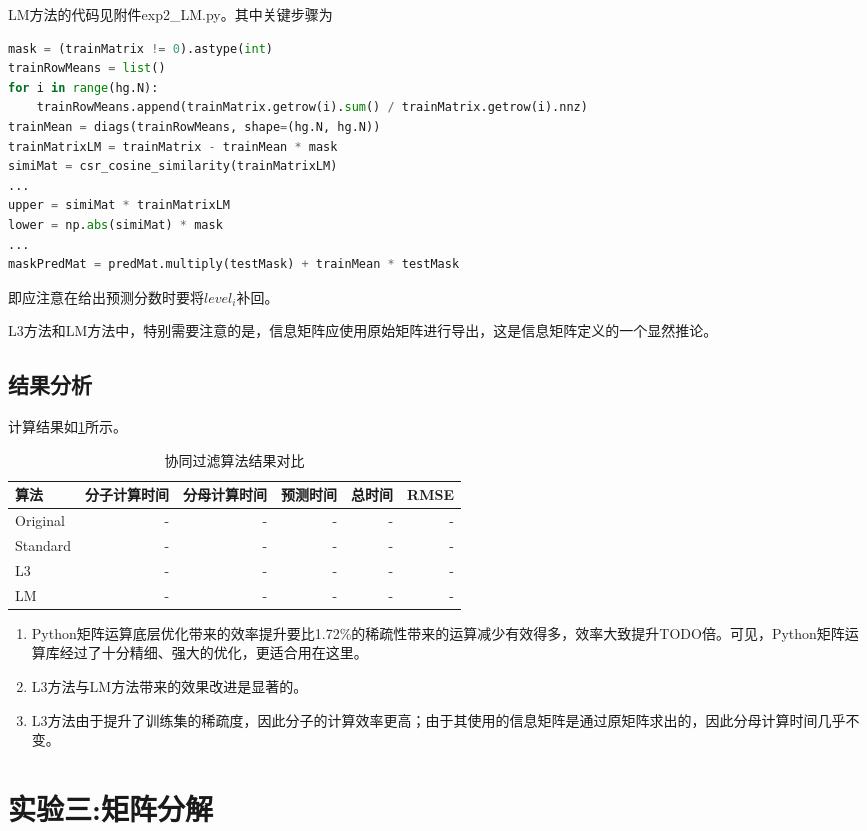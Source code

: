 \documentclass[a4paper,12pt]{article}
\begin{document}
    LM方法的代码见附件exp2\_LM.py。其中关键步骤为
    \begin{lstlisting}[language=python]
mask = (trainMatrix != 0).astype(int)
trainRowMeans = list()
for i in range(hg.N):
    trainRowMeans.append(trainMatrix.getrow(i).sum() / trainMatrix.getrow(i).nnz)
trainMean = diags(trainRowMeans, shape=(hg.N, hg.N))
trainMatrixLM = trainMatrix - trainMean * mask
simiMat = csr_cosine_similarity(trainMatrixLM)
...
upper = simiMat * trainMatrixLM
lower = np.abs(simiMat) * mask
...
maskPredMat = predMat.multiply(testMask) + trainMean * testMask
    \end{lstlisting}
    即应注意在给出预测分数时要将$level_i$补回。

    L3方法和LM方法中，特别需要注意的是，信息矩阵应使用原始矩阵进行导出，这是信息矩阵定义的一个显然推论。
    \subsection{结果分析}
    计算结果如\cref{tbl:exp2}所示。
    \begin{table}
      \centering
      \caption{协同过滤算法结果对比}
      \label{tbl:exp2}
      \begin{tabular}{lrrrrr}
        \toprule
        算法&分子计算时间&分母计算时间&预测时间&总时间&RMSE\\
        \midrule
        Original & - & - & - & - & - \\
        Standard & - & - & - & - & - \\
        L3 & - & - & - & - & - \\
        LM & - & - & - & - & - \\
        \bottomrule
      \end{tabular}
    \end{table}
    \begin{enumerate}
      \item Python矩阵运算底层优化带来的效率提升要比1.72\%的稀疏性带来的运算减少有效得多，效率大致提升TODO倍。可见，Python矩阵运算库经过了十分精细、强大的优化，更适合用在这里。
      \item L3方法与LM方法带来的效果改进是显著的。
      \item L3方法由于提升了训练集的稀疏度，因此分子的计算效率更高；由于其使用的信息矩阵是通过原矩阵求出的，因此分母计算时间几乎不变。
    \end{enumerate}
    \section{实验三:矩阵分解}
\end{document}
